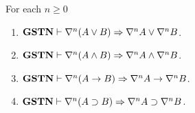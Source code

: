\begin{lem}\label{lem:l-nabla-dist} For each $n \geq 0$
	\begin{enumerate}
		\item $\mathbf{GSTN} \vdash \nabla^n (A \vee B) \Rightarrow \nabla^n A \vee \nabla^n B$.
	
		\item $\mathbf{GSTN} \vdash \nabla^n (A \wedge B) \Rightarrow \nabla^n A \wedge \nabla^n B$. 
	
		\item $\mathbf{GSTN} \vdash \nabla^n (A \rightarrow B) \Rightarrow \nabla^n A \rightarrow \nabla^n B$.
		
    \item $\mathbf{GSTN} \vdash \nabla^n (A \supset B) \Rightarrow \nabla^n A \supset \nabla^n B$.
	\end{enumerate}
\end{lem}

